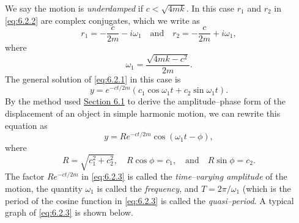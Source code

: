 \documentclass{ximera}
\begin{document}
We say the motion is \textit{underdamped} if $c<\sqrt{4mk}$. In this
case $r_1$ and $r_2$ in \eqref{eq:6.2.2} are complex conjugates, which we
write as
$$
r_1=-\frac{c}{2m}-i\omega_1\quad\mbox{and}\quad
r_2=-\frac{c}{2m}+i\omega_1,
$$
where
$$
\omega_1=\frac{\sqrt{4mk-c^2}}{2m}.
$$
The general solution of  \eqref{eq:6.2.1} in this case is
$$
y=e^{-ct/2m}(c_1\cos\omega_1 t+c_2\sin\omega_1 t).
$$
By the method used \href{https://xerxes.ximera.org/differentialequations/main/springProblemsI/springProblemsI}{Section 6.1}
to derive the
amplitude--phase form of the displacement of an object in simple
harmonic motion, we can rewrite this equation as
\begin{equation}\label{eq:6.2.3}
y=Re^{-ct/2m}\cos(\omega_1 t-\phi),
\end{equation}
 where
$$
R=\sqrt{c_1^2+c_2^2},\quad R\cos\phi=c_1,\quad\mbox{and}\quad R\sin\phi=c_2.
$$
The factor $Re^{-ct/2m}$ in \eqref{eq:6.2.3} is called the \textit{time--varying amplitude} of the motion, the quantity $\omega_1$ is
called the \textit{frequency}, and $T=2\pi/\omega_1$ (which is the
period of the cosine function in \eqref{eq:6.2.3} is called the \textit{quasi--period}. A typical graph of \eqref{eq:6.2.3} is shown below.

\begin{center}
\end{center}

 
\end{document}
